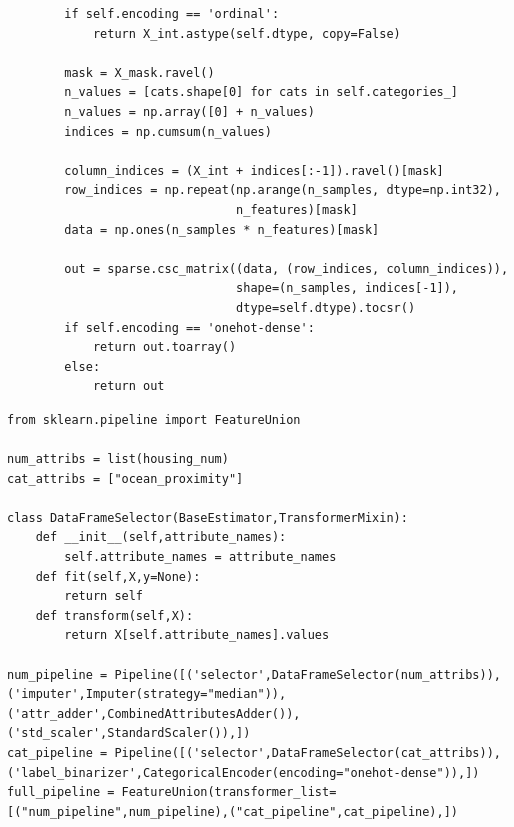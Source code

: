 \documentclass[UTF8]{ctexart}
\begin{document}
\begin{lstlisting}
        if self.encoding == 'ordinal':
            return X_int.astype(self.dtype, copy=False)

        mask = X_mask.ravel()
        n_values = [cats.shape[0] for cats in self.categories_]
        n_values = np.array([0] + n_values)
        indices = np.cumsum(n_values)

        column_indices = (X_int + indices[:-1]).ravel()[mask]
        row_indices = np.repeat(np.arange(n_samples, dtype=np.int32),
                                n_features)[mask]
        data = np.ones(n_samples * n_features)[mask]

        out = sparse.csc_matrix((data, (row_indices, column_indices)),
                                shape=(n_samples, indices[-1]),
                                dtype=self.dtype).tocsr()
        if self.encoding == 'onehot-dense':
            return out.toarray()
        else:
            return out
\end{lstlisting}

\begin{lstlisting}
from sklearn.pipeline import FeatureUnion

num_attribs = list(housing_num)
cat_attribs = ["ocean_proximity"]

class DataFrameSelector(BaseEstimator,TransformerMixin):
    def __init__(self,attribute_names):
        self.attribute_names = attribute_names
    def fit(self,X,y=None):
        return self
    def transform(self,X):
        return X[self.attribute_names].values

num_pipeline = Pipeline([('selector',DataFrameSelector(num_attribs)),('imputer',Imputer(strategy="median")),('attr_adder',CombinedAttributesAdder()),('std_scaler',StandardScaler()),])
cat_pipeline = Pipeline([('selector',DataFrameSelector(cat_attribs)),('label_binarizer',CategoricalEncoder(encoding="onehot-dense")),])
full_pipeline = FeatureUnion(transformer_list=[("num_pipeline",num_pipeline),("cat_pipeline",cat_pipeline),])
\end{lstlisting}	
\end{document}
